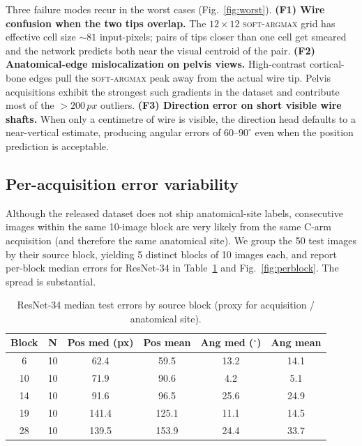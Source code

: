 \documentclass[conference,10pt,letterpaper]{IEEEtran}
\newcommand{\rnt}{ResNet-34}
\newcommand{\softargmax}{\textsc{soft-argmax}}
\newcommand{\px}{\,px}
\begin{document}
Three failure modes recur in the worst cases (Fig.~\ref{fig:worst}).
\textbf{(F1) Wire confusion when the two tips overlap.} The
$12{\times}12$ \softargmax{} grid has effective cell size $\sim 81$
input-pixels; pairs of tips closer than one cell get smeared and the
network predicts both near the visual centroid of the pair.
\textbf{(F2) Anatomical-edge mislocalization on pelvis views.}
High-contrast cortical-bone edges pull the \softargmax{} peak away from
the actual wire tip. Pelvis acquisitions exhibit the strongest such
gradients in the dataset and contribute most of the $>200\px$ outliers.
\textbf{(F3) Direction error on short visible wire shafts.} When only a
centimetre of wire is visible, the direction head defaults to a
near-vertical estimate, producing angular errors of $60$--$90^\circ$
even when the position prediction is acceptable.

\subsection{Per-acquisition error variability}
\label{sec:perblock}
Although the released dataset does not ship anatomical-site labels,
consecutive images within the same 10-image block are very likely from
the same C-arm acquisition (and therefore the same anatomical site). We
group the 50 test images by their source block, yielding 5 distinct
blocks of 10 images each, and report per-block median errors for
\rnt{} in Table~\ref{tab:perblock} and Fig.~\ref{fig:perblock}. The
spread is substantial.

\begin{table}[t]
\caption{\protect\rnt{} median test errors by source block (proxy for
acquisition / anatomical site).}
\label{tab:perblock}
\centering
\renewcommand{\arraystretch}{1.15}
\small
\begin{tabular}{c c c c c c}
\toprule
\textbf{Block} & \textbf{N} & \textbf{Pos med (px)} & \textbf{Pos mean} &
\textbf{Ang med ($^\circ$)} & \textbf{Ang mean}\\
\midrule
  6 & 10 &  62.4 &  59.5 & 13.2 & 14.1\\
 10 & 10 &  71.9 &  90.6 &  4.2 &  5.1\\
 14 & 10 &  91.6 &  96.5 & 25.6 & 24.9\\
 19 & 10 & 141.4 & 125.1 & 11.1 & 14.5\\
 28 & 10 & 139.5 & 153.9 & 24.4 & 33.7\\
\bottomrule
\end{tabular}
\end{table}
\end{document}
